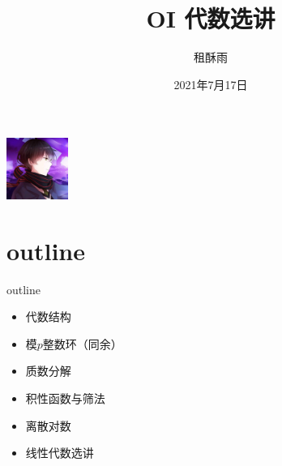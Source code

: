 \documentclass{beamer}
\title{OI 代数选讲}
\date{2021年7月17日}
\author{租酥雨}
\begin{document}
\small
	
	\begin{frame}
	\titlepage
		\begin{center}
		\includegraphics[width=2.0cm]{zsy.jpg}
		\end{center}
	\end{frame}
\section{outline}
\begin{frame}{outline}
	\begin{itemize}
		\item 代数结构
		\item 模$p$整数环（同余）
		\item 质数分解
		\item 积性函数与筛法
		\item 离散对数
		\item 线性代数选讲
	\end{itemize}
\end{frame}
\end{document}
